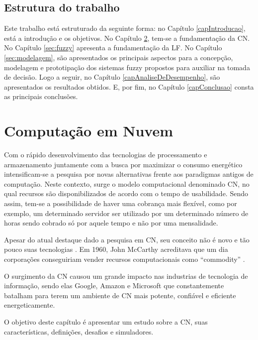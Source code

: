 \documentclass[tcc,capa]{texufpel}
\begin{document}
\section{Estrutura do trabalho}

Este trabalho está estruturado da seguinte forma: no Capítulo \ref{capIntroducao}, está a introdução e os objetivos. No Capítulo \ref{sec:computacaoemnuvem}, tem-se a fundamentação da CN. No Capítulo \ref{sec:fuzzy} apresenta a fundamentação da LF. No Capítulo \ref{sec:modelagem}, são apresentados os principais aspectos para a concepção, modelagem e prototipação dos sistemas fuzzy propostos para auxiliar na tomada de decisão. Logo a seguir, no Capítulo \ref{capAnaliseDeDesempenho}, são apresentados os resultados obtidos. E, por fim, no Capítulo \ref{capConclusao} consta as principais conclusões.



\chapter{Computação em Nuvem} \label{sec:computacaoemnuvem} 

Com o rápido desenvolvimento das tecnologias de processamento e armazenamento juntamente com a busca por maximizar o consumo energético intensificam-se a pesquisa por novas alternativas frente aos paradigmas antigos de computação. Neste contexto, surge o modelo computacional denominado CN, no qual recursos são disponibilizados de acordo com o tempo de usabilidade. Sendo assim, tem-se a possibilidade de haver uma cobrança mais flexível, como por exemplo, um determinado servidor ser utilizado por um determinado número de horas sendo cobrado só por aquele tempo e não por uma mensalidade. 

Apesar do atual destaque dado a pesquisa em CN, seu conceito não é novo e tão pouco suas tecnologias \cite{hamdaqa2012cloud}. Em 1960, John McCarthy acreditava que um dia corporações conseguiriam vender recursos computacionais como “commodity” \cite{holick2011evaluation}.

O surgimento da CN causou um grande impacto nas industrias de tecnologia de informação, sendo elas Google, Amazon e Microsoft que constantemente batalham para terem um ambiente de CN mais potente, confiável e eficiente energeticamente.

O objetivo deste capítulo é apresentar um estudo sobre a CN, suas características, definições, desafios e simuladores.


\end{document}
